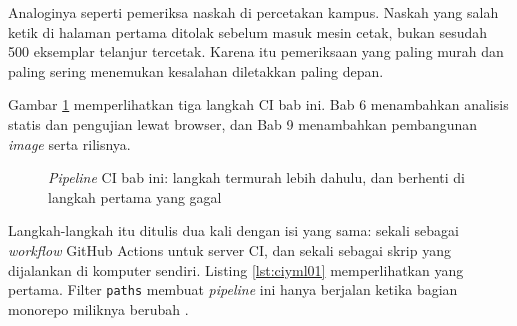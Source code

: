 Analoginya seperti pemeriksa naskah di percetakan kampus. Naskah yang salah
ketik di halaman pertama ditolak sebelum masuk mesin cetak, bukan sesudah 500
eksemplar telanjur tercetak. Karena itu pemeriksaan yang paling murah dan
paling sering menemukan kesalahan diletakkan paling depan.

Gambar \ref{fig:ci01} memperlihatkan tiga langkah CI bab ini. Bab 6
menambahkan analisis statis dan pengujian lewat browser, dan Bab 9
menambahkan pembangunan \textit{image} serta rilisnya.

\begin{figure}[!htb]
  \centering
  \caption{\textit{Pipeline} CI bab ini: langkah termurah lebih dahulu, dan
           berhenti di langkah pertama yang gagal}
  \label{fig:ci01}
\end{figure}

Langkah-langkah itu ditulis dua kali dengan isi yang sama: sekali sebagai
\textit{workflow} GitHub Actions untuk server CI, dan sekali sebagai skrip
yang dijalankan di komputer sendiri. Listing \ref{lst:ciyml01} memperlihatkan
yang pertama. Filter \texttt{paths} membuat \textit{pipeline} ini hanya
berjalan ketika bagian monorepo miliknya berubah \cite{github-actions-syntax}.

